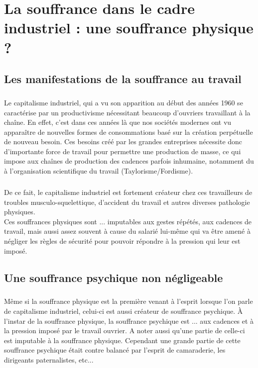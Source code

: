 \documentclass{report}
\begin{document}
\chapter{La souffrance dans le cadre industriel : une souffrance physique ?}
	\section{Les manifestations de la souffrance au travail}
		\paragraph{}
			Le capitalisme industriel, qui a vu son apparition au début des années 1960 se caractérise par un productivisme nécessitant beaucoup d'ouvriers travaillant à la chaîne. En effet, c'est dans ces années là que nos sociétés modernes ont vu apparaître de nouvelles formes de consommations basé sur la création perpétuelle de nouveau besoin. Ces besoins créé par les grandes entreprises nécessite donc d'importante force de travail pour permettre une production de masse, ce qui impose aux chaînes de production des cadences parfois inhumaine, notamment du à l'organisation scientifique du travail (Taylorisme/Fordisme).

		\paragraph{}
			De ce fait, le capitalisme industriel est fortement créateur chez ces travailleurs de troubles musculo-squelettique, d'accident du travail et autres diverses pathologie physiques.\\
			Ces souffrances physiques sont ... imputables aux gestes répétés, aux cadences de travail, mais aussi assez souvent à cause du salarié lui-même qui va être amené à négliger les règles de sécurité pour pouvoir répondre à la pression qui leur est imposé. 

	\newpage{}
	\section{Une souffrance psychique non négligeable}
		\paragraph{}
			Même si la souffrance physique est la première venant à l'esprit lorsque l'on parle de capitalisme industriel, celui-ci est aussi créateur de souffrance psychique. À l'instar de la souffrance physique, la souffrance psychique est ... aux cadences et à la pression imposé par le travail ouvrier. A noter aussi qu'une partie de celle-ci est imputable à la souffrance physique. Cependant une grande partie de cette souffrance psychique était contre balancé par l'esprit de camaraderie, les dirigeants paternalistes, etc...
\end{document}
